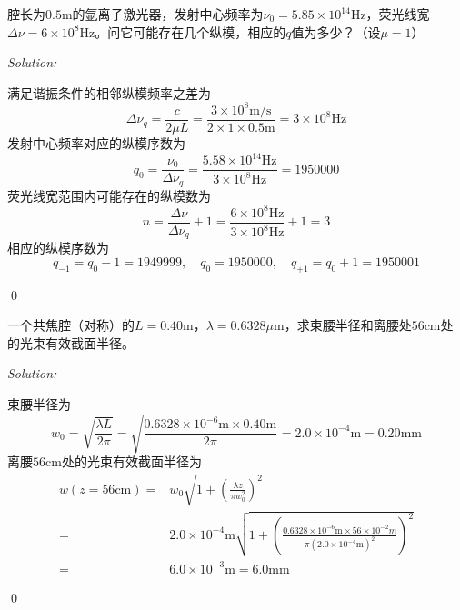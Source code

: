 \documentclass[12pt,a4paper]{article}
\newenvironment{problem}[2][Problem]{\begin{trivlist}
\item[\hskip \labelsep {\bfseries #1}\hskip \labelsep {\bfseries #2.}]}{\end{trivlist}}
\newenvironment{sol}
    {\emph{Solution:}
    }
    {
    \qed
    }
\begin{document}
\begin{problem}{3.1}
腔长为$0.5$m的氩离子激光器，发射中心频率为$\nu_0=5.85\times10^{14}$Hz，荧光线宽$\Delta\nu=6\times10^8$Hz。问它可能存在几个纵模，相应的$q$值为多少？（设$\mu=1$）
\end{problem}
\begin{sol}
满足谐振条件的相邻纵模频率之差为
\begin{equation}
\Delta\nu_q=\frac{c}{2\mu L}=\frac{3\times10^8\text{m}/\text{s}}{2\times1\times0.5\text{m}}=3\times10^8\text{Hz}
\end{equation}
发射中心频率对应的纵模序数为
\begin{equation}
q_0=\frac{\nu_0}{\Delta\nu_q}=\frac{5.58\times10^{14}\text{Hz}}{3\times10^8\text{Hz}}=1950000
\end{equation}
荧光线宽范围内可能存在的纵模数为
\[
n=\frac{\Delta\nu}{\Delta\nu_q}+1=\frac{6\times10^8\text{Hz}}{3\times10^8\text{Hz}}+1=3
\]
相应的纵模序数为
\[
q_{-1}=q_0-1=1949999,\quad q_0=1950000,\quad q_{+1}=q_0+1=1950001
\]
\end{sol}

\begin{problem}{3.7}
一个共焦腔（对称）的$L=0.40$m，$\lambda=0.6328\mu$m，求束腰半径和离腰处$56$cm处的光束有效截面半径。
\end{problem}
\begin{sol}
束腰半径为
\begin{equation}
w_0=\sqrt{\frac{\lambda L}{2\pi}}=\sqrt{\frac{0.6328\times10^{-6}\text{m}\times0.40\text{m}}{2\pi}}=2.0\times10^{-4}\text{m}=0.20\text{mm}
\end{equation}
离腰$56$cm处的光束有效截面半径为
\begin{align}
\nonumber w(z=56\text{cm})=&w_0\sqrt{1+\left(\frac{\lambda z}{\pi w_0^2}\right)^2}\\
\nonumber=&2.0\times10^{-4}\text{m}\sqrt{1+\left(\frac{0.6328\times10^{-6}\text{m}\times56\times10^{-2}m}{\pi(2.0\times10^{-4}\text{m})^2}\right)^2}\\
=&6.0\times10^{-3}\text{m}=6.0\text{mm}
\end{align}
\end{sol}
\end{document}
